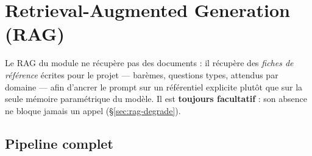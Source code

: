 \section{Retrieval-Augmented Generation (RAG)}
\label{sec:rag}

Le RAG du module ne récupère pas des documents : il récupère des \emph{fiches de
référence} écrites pour le projet --- barèmes, questions types, attendus par
domaine --- afin d'ancrer le prompt sur un référentiel explicite plutôt que sur
la seule mémoire paramétrique du modèle. Il est \textbf{toujours facultatif} :
son absence ne bloque jamais un appel (§\ref{sec:rag-degrade}).

\subsection{Pipeline complet}

